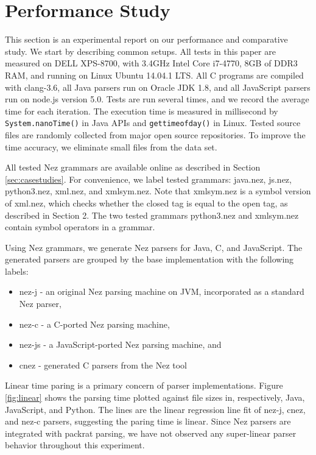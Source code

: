 \documentclass[preprint]{sigplanconf}
\begin{document}
\section{Performance Study} \label{sec:perf}

This section is an experimental report on our performance and comparative study. We start by describing common setups. 
All tests in this paper are measured on DELL XPS-8700, with 3.4GHz Intel Core i7-4770, 8GB of DDR3 RAM, and running on Linux Ubuntu 14.04.1 LTS. 
All C programs are compiled with clang-3.6, all Java parsers run on Oracle JDK 1.8, and all JavaScript parsers run on node.js version 5.0. 
Tests are run several times, and we record the average time for each iteration. 
The execution time is measured in millisecond by {\small {\tt System.nanoTime()}} in Java APIs and {\small {\tt gettimeofday()}} in Linux. Tested source files are randomly collected from major open source repositories. To improve the time accuracy, we eliminate small files from the data set. 

All tested Nez grammars are available online as described in Section \ref{sec:casestudies}. For convenience, we label tested grammars: {\sf java.nez}, {\sf js.nez}, {\sf python3.nez}, {\sf xml.nez}, and {\sf xmlsym.nez}. Note that {\sf xmlsym.nez} is a symbol version of {\sf xml.nez}, which checks whether the closed tag is equal to the open tag, as described in Section 2. The two tested grammars {\sf python3.nez} and {\sf xmlsym.nez} contain symbol operators in a grammar. 

Using Nez grammars, we generate Nez parsers for Java, C, and JavaScript. The generated parsers are grouped by the base implementation with the following labels:

\begin{itemize}
\item {\sf nez-j} - an original Nez parsing machine on JVM, incorporated as a standard Nez parser,
\item {\sf nez-c} - a C-ported Nez parsing machine, 
\item {\sf nez-js} - a JavaScript-ported Nez parsing machine, and
\item {\sf cnez} - generated C parsers from the Nez tool
\end{itemize}

Linear time paring is a primary concern of parser implementations. 
Figure \ref{fig:linear} shows the parsing time plotted against file sizes in, respectively, Java, JavaScript, and Python.
The lines are the linear regression line fit of {\sf nez-j}, {\sf cnez}, and {\sf nez-c} parsers, suggesting the paring time is linear. Since Nez parsers are integrated with packrat parsing,  we have not observed any super-linear parser behavior throughout this experiment.
\end{document}
